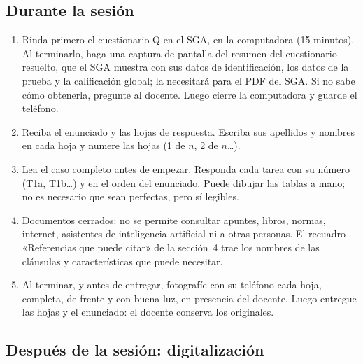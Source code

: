 \documentclass[11pt]{article}
\newcommand{\subseccion}[1]{\subsection{\textcolor{midblue}{#1}}}
\begin{document}
\subseccion{Durante la sesión}

\begin{enumerate}[leftmargin=18pt,itemsep=2pt]
	\item Rinda primero el cuestionario Q en el SGA, en la computadora (15 minutos). Al terminarlo, haga una captura de pantalla del resumen del cuestionario resuelto, que el SGA muestra con sus datos de identificación, los datos de la prueba y la calificación global; la necesitará para el PDF del SGA. Si no sabe cómo obtenerla, pregunte al docente. Luego cierre la computadora y guarde el teléfono.
	\item Reciba el enunciado y las hojas de respuesta. Escriba sus apellidos y nombres en cada hoja y numere las hojas (1 de $n$, 2 de $n$\ldots).
	\item Lea el caso completo antes de empezar. Responda cada tarea con su número (T1a, T1b\ldots) y en el orden del enunciado. Puede dibujar las tablas a mano; no es necesario que sean perfectas, pero sí legibles.
	\item Documentos cerrados: no se permite consultar apuntes, libros, normas, internet, asistentes de inteligencia artificial ni a otras personas. El recuadro «Referencias que puede citar» de la sección~4 trae los nombres de las cláusulas y características que puede necesitar.
	\item Al terminar, y antes de entregar, fotografíe con su teléfono cada hoja, completa, de frente y con buena luz, en presencia del docente. Luego entregue las hojas y el enunciado: el docente conserva los originales.
\end{enumerate}

\subseccion{Después de la sesión: digitalización}
\end{document}
